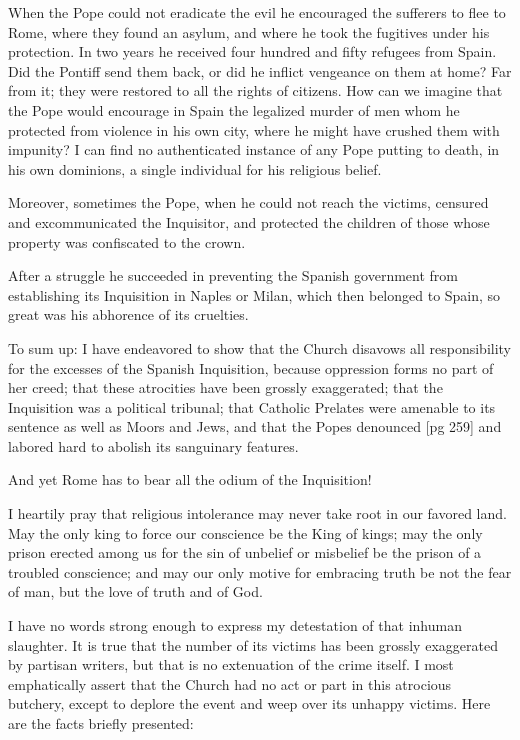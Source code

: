 When the Pope could not eradicate the evil he
encouraged the sufferers to flee to Rome, where
they found an asylum, and where he took the fugitives
under his protection. In two years he received
four hundred and fifty refugees from
Spain. Did the Pontiff send them back, or did
he inflict vengeance on them at home? Far from
it; they were restored to all the rights of citizens.
How can we imagine that the Pope would encourage
in Spain the legalized murder of men
whom he protected from violence in his own city,
where he might have crushed them with impunity?
I can find no authenticated instance of any Pope
putting to death, in his own dominions, a single
individual for his religious belief.

Moreover, sometimes the Pope, when he could
not reach the victims, censured and excommunicated
the Inquisitor, and protected the children
of those whose property was confiscated to the
crown.

After a struggle he succeeded in preventing
the Spanish government from establishing its Inquisition
in Naples or Milan, which then belonged
to Spain, so great was his abhorence of its cruelties.

To sum up: I have endeavored to show that
the Church disavows all responsibility for the
excesses of the Spanish Inquisition, because oppression
forms no part of her creed; that these
atrocities have been grossly exaggerated; that the
Inquisition was a political tribunal; that Catholic
Prelates were amenable to its sentence as well as
Moors and Jews, and that the Popes denounced
[pg 259]
and labored hard to abolish its sanguinary features.

And yet Rome has to bear all the odium of
the Inquisition!

I heartily pray that religious intolerance may
never take root in our favored land. May the
only king to force our conscience be the King of
kings; may the only prison erected among us for
the sin of unbelief or misbelief be the prison of a
troubled conscience; and may our only motive for
embracing truth be not the fear of man, but the
love of truth and of God.


I have no words strong enough to express my
detestation of that inhuman slaughter. It is true
that the number of its victims has been grossly
exaggerated by partisan writers, but that is no
extenuation of the crime itself. I most emphatically
assert that the Church had no act or part in
this atrocious butchery, except to deplore the event
and weep over its unhappy victims. Here are the
facts briefly presented:


